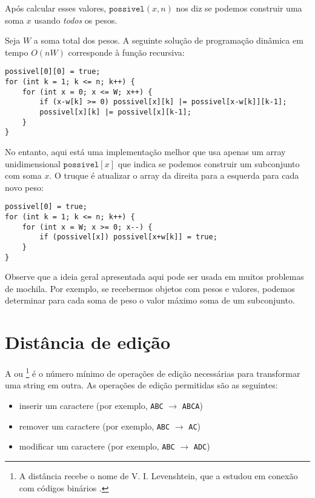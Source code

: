 Após calcular esses valores, $\texttt{possivel}(x,n)$
nos diz se podemos construir uma
soma $x$ usando \emph{todos} os pesos.

Seja $W$ a soma total dos pesos.
A seguinte solução de programação dinâmica em tempo $O(nW)$
corresponde à função recursiva:
\begin{lstlisting}
possivel[0][0] = true;
for (int k = 1; k <= n; k++) {
    for (int x = 0; x <= W; x++) {
        if (x-w[k] >= 0) possivel[x][k] |= possivel[x-w[k]][k-1];
        possivel[x][k] |= possivel[x][k-1];
    }
}
\end{lstlisting}

No entanto, aqui está uma implementação melhor que usa apenas
um array unidimensional $\texttt{possivel}[x]$
que indica se podemos construir um subconjunto com soma $x$.
O truque é atualizar o array da direita para a esquerda para
cada novo peso:
\begin{lstlisting}
possivel[0] = true;
for (int k = 1; k <= n; k++) {
    for (int x = W; x >= 0; x--) {
        if (possivel[x]) possivel[x+w[k]] = true;
    }
}
\end{lstlisting}

Observe que a ideia geral apresentada aqui pode ser usada
em muitos problemas de mochila.
Por exemplo, se recebermos objetos com pesos e valores,
podemos determinar para cada soma de peso o valor máximo
soma de um subconjunto.

\section{Distância de edição}


A  ou \footnote{A distância
recebe o nome de V. I. Levenshtein, que a estudou em conexão com códigos binários \cite{lev66}.}
é o número mínimo de operações de edição
necessárias para transformar uma string
em outra.
As operações de edição permitidas são as seguintes:
\begin{itemize}
\item inserir um caractere (por exemplo, \texttt{ABC} $\rightarrow$ \texttt{ABCA})
\item remover um caractere (por exemplo, \texttt{ABC} $\rightarrow$ \texttt{AC})
\item modificar um caractere (por exemplo, \texttt{ABC} $\rightarrow$ \texttt{ADC})
\end{itemize}

